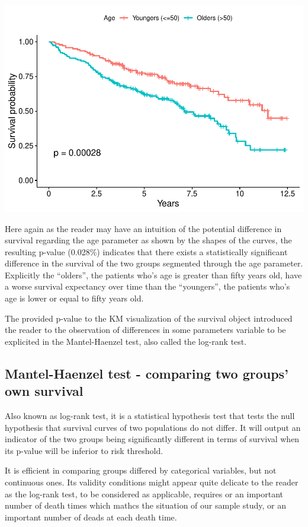 \documentclass[]{article}
\begin{document}
\includegraphics{report_files/figure-latex/unnamed-chunk-12-1.pdf}

Here again as the reader may have an intuition of the potential
difference in survival regarding the age parameter as shown by the
shapes of the curves, the resulting p-value (0.028\%) indicates that
there exists a statistically significant difference in the survival of
the two groups segmented through the age parameter. Explicitly the
``olders'', the patients who's age is greater than fifty years old, have
a worse survival expectancy over time than the ``youngers'', the
patients who's age is lower or equal to fifty years old.

The provided p-value to the KM visualization of the survival object
introduced the reader to the observation of differences in some
parameters variable to be explicited in the Mantel-Haenzel test, also
called the log-rank test.

\subsection{Mantel-Haenzel test - comparing two groups' own
survival}\label{mantel-haenzel-test---comparing-two-groups-own-survival}

Also known as log-rank test, it is a statistical hypothesis test that
tests the null hypothesis that survival curves of two populations do not
differ. It will output an indicator of the two groups being
significantly different in terms of survival when its p-value will be
inferior to risk threshold.

It is efficient in comparing groups differed by categorical variables,
but not continuous ones. Its validity conditions might appear quite
delicate to the reader as the log-rank test, to be considered as
applicable, requires or an important number of death times which mathcs
the situation of our sample study, or an important number of deads at
each death time.
\end{document}
